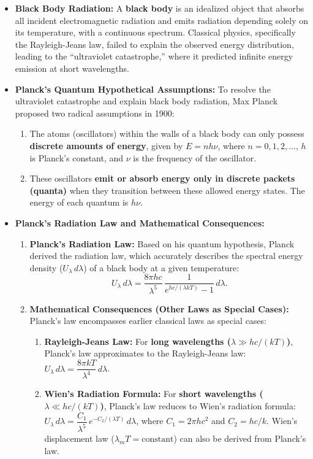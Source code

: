 \documentclass[12pt]{article}
\begin{document}
\begin{itemize}
    \item \textbf{Black Body Radiation:} A \textbf{black body} is an idealized object that absorbs all incident electromagnetic radiation and emits radiation depending solely on its temperature, with a continuous spectrum. Classical physics, specifically the Rayleigh-Jeans law, failed to explain the observed energy distribution, leading to the ``ultraviolet catastrophe,'' where it predicted infinite energy emission at short wavelengths.
    \item \textbf{Planck's Quantum Hypothetical Assumptions:} To resolve the ultraviolet catastrophe and explain black body radiation, Max Planck proposed two radical assumptions in 1900:
    \begin{enumerate}[label=\alph*.]
        \item The atoms (oscillators) within the walls of a black body can only possess \textbf{discrete amounts of energy}, given by $E=n h\nu$, where $n=0,1,2,\dots$, $h$ is Planck's constant, and $\nu$ is the frequency of the oscillator.
        \item These oscillators \textbf{emit or absorb energy only in discrete packets (quanta)} when they transition between these allowed energy states. The energy of each quantum is $h\nu$.
    \end{enumerate}
    \item \textbf{Planck's Radiation Law and Mathematical Consequences:}
    \begin{enumerate}[label=\alph*.]
        \item \textbf{Planck's Radiation Law:} Based on his quantum hypothesis, Planck derived the radiation law, which accurately describes the spectral energy density ($U_{\lambda}\,d\lambda$) of a black body at a given temperature:
        \[
          U_{\lambda}\,d\lambda=\frac{8\pi hc}{\lambda^5}\,\frac{1}{e^{hc/(\lambda kT)}-1}\,d\lambda.
        \]
        \item \textbf{Mathematical Consequences (Other Laws as Special Cases):} Planck's law encompasses earlier classical laws as special cases:
        \begin{enumerate}[label=\roman*.]
            \item \textbf{Rayleigh-Jeans Law:} For \textbf{long wavelengths ($\lambda \gg hc/(kT)$)}, Planck's law approximates to the Rayleigh-Jeans law: $U_{\lambda}\,d\lambda=\dfrac{8\pi kT}{\lambda^4}\,d\lambda$.
            \item \textbf{Wien's Radiation Formula:} For \textbf{short wavelengths ($\lambda \ll hc/(kT)$)}, Planck's law reduces to Wien's radiation formula: $U_{\lambda}\,d\lambda = \dfrac{C_1}{\lambda^5}\,e^{-C_2/(\lambda T)}\,d\lambda$, where $C_1=2\pi hc^2$ and $C_2=hc/k$. Wien's displacement law ($\lambda_m T=\text{constant}$) can also be derived from Planck's law.

\end{enumerate}
\end{enumerate}
\end{itemize}
\end{document}
